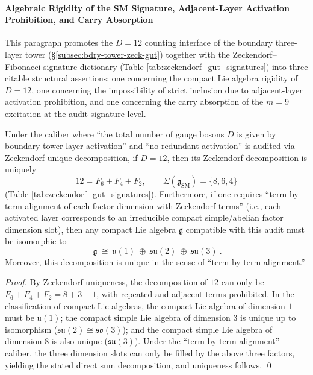 \paragraph{Algebraic Rigidity of the SM Signature, Adjacent-Layer Activation Prohibition, and Carry Absorption}\label{par:bdry-tower-sm-rigidity-adjacent-carry}
This paragraph promotes the \(D=12\) counting interface of the boundary three-layer tower (\S\ref{subsec:bdry-tower-zeck-gut}) together with the Zeckendorf--Fibonacci signature dictionary (Table \ref{tab:zeckendorf_gut_signatures}) into three citable structural assertions: one concerning the compact Lie algebra rigidity of \(D=12\), one concerning the impossibility of strict inclusion due to adjacent-layer activation prohibition, and one concerning the carry absorption of the \(m=9\) excitation at the audit signature level.

\begin{proposition}\label{prop:sm-zeckendorf-lie-algebra-rigidity}
Under the caliber where ``the total number of gauge bosons \(D\) is given by boundary tower layer activation'' and ``no redundant activation'' is audited via Zeckendorf unique decomposition,
if \(D=12\), then its Zeckendorf decomposition is uniquely
\[
12=F_{6}+F_{4}+F_{2},
\qquad
\Sigma(\mathfrak g_{\mathrm{SM}})=\{8,6,4\}
\]
(Table \ref{tab:zeckendorf_gut_signatures}).
Furthermore, if one requires ``term-by-term alignment of each factor dimension with Zeckendorf terms'' (i.e., each activated layer corresponds to an irreducible compact simple/abelian factor dimension slot),
then any compact Lie algebra \(\mathfrak g\) compatible with this audit must be isomorphic to
\[
\boxed{\ \mathfrak g\ \cong\ \mathfrak u(1)\ \oplus\ \mathfrak{su}(2)\ \oplus\ \mathfrak{su}(3)\ }.
\]
Moreover, this decomposition is unique in the sense of ``term-by-term alignment.''
\end{proposition}
\begin{proof}
By Zeckendorf uniqueness, the decomposition of \(12\) can only be \(F_6+F_4+F_2=8+3+1\), with repeated and adjacent terms prohibited.
In the classification of compact Lie algebras, the compact Lie algebra of dimension \(1\) must be \(\mathfrak u(1)\);
the compact simple Lie algebra of dimension \(3\) is unique up to isomorphism (\(\mathfrak{su}(2)\cong\mathfrak{so}(3)\));
and the compact simple Lie algebra of dimension \(8\) is also unique (\(\mathfrak{su}(3)\)).
Under the ``term-by-term alignment'' caliber, the three dimension slots can only be filled by the above three factors, yielding the stated direct sum decomposition, and uniqueness follows. \qed
\end{proof}

